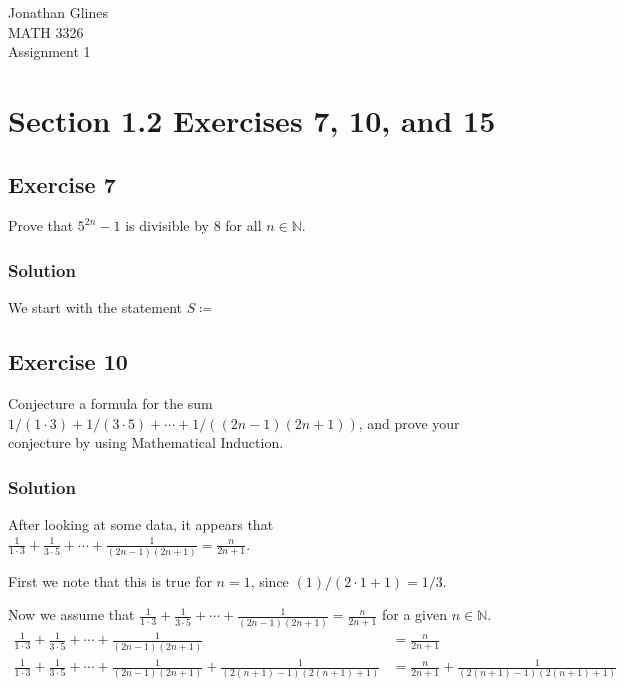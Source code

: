 \documentclass[12pt]{article}
\begin{document}
\begin{flushright}
{\Large
Jonathan Glines \\
MATH 3326 \\
Assignment 1 \\
}
\end{flushright}
\section*{Section 1.2 Exercises 7, 10, and 15}
\subsection*{Exercise 7}
Prove that $5^{2n} - 1$ is divisible by 8 for all $n \in \mathbb{N}$.
\subsubsection*{Solution}
We start with the statement $S \coloneqq $

\subsection*{Exercise 10}
Conjecture a formula for the sum $1/\left(1\cdot 3\right) + 1/\left(3 \cdot 5\right) + \cdots + 1 /\left(\left(2n - 1\right)\left(2n+1\right)\right)$, and prove your conjecture by using Mathematical Induction.
\subsubsection*{Solution}
After looking at some data, it appears that $\frac{1}{1 \cdot 3} + \frac{1}{3 \cdot 5} + \cdots + \frac{1}{\left(2n - 1\right)\left(2n + 1\right)} = \frac{n}{2n + 1}$.

First we note that this is true for $n = 1$, since $\left(1\right)/\left(2 \cdot 1 + 1\right) = 1/3$.

Now we assume that $\frac{1}{1 \cdot 3} + \frac{1}{3 \cdot 5} + \cdots + \frac{1}{\left(2n - 1\right)\left(2n + 1\right)} = \frac{n}{2n + 1}$ for a given $n \in \mathbb{N}$.
\begin{align*}
\frac{1}{1 \cdot 3} + \frac{1}{3 \cdot 5} + \cdots + \frac{1}{\left(2n - 1\right)\left(2n + 1\right)} &= \frac{n}{2n + 1} \\
\frac{1}{1 \cdot 3} + \frac{1}{3 \cdot 5} + \cdots + \frac{1}{\left(2n - 1\right)\left(2n + 1\right)} + \frac{1}{\left(2\left(n + 1\right) - 1\right)\left(2\left(n + 1\right) + 1\right)} &= \frac{n}{2n + 1} + \frac{1}{\left(2\left(n + 1\right) - 1\right)\left(2\left(n + 1\right) + 1\right)} \\
\end{align*}
\end{document}
